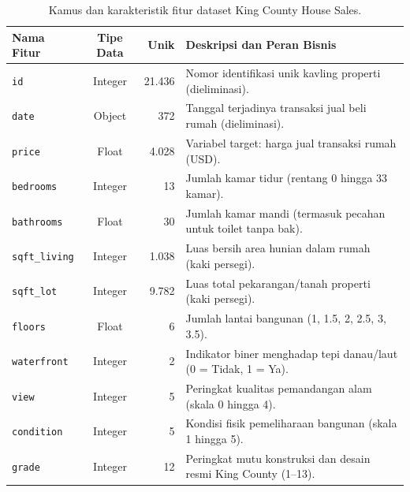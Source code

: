 \documentclass[a4paper,oneside,12pt]{report}
\begin{document}
\begin{table}[H]
	\centering
	\caption{Kamus dan karakteristik fitur dataset King County House Sales.}
	\label{tab:fitur-kc}
	\scriptsize
	\begin{tabularx}{\linewidth}{|l|c|r|>{\raggedright\arraybackslash}X|}
		\hline
		\textbf{Nama Fitur}     & \textbf{Tipe Data} & \textbf{Unik} & \textbf{Deskripsi dan Peran Bisnis}                             \\
		\hline
		\texttt{id}             & Integer            & 21.436        & Nomor identifikasi unik kavling properti (dieliminasi).         \\
		\hline
		\texttt{date}           & Object             & 372           & Tanggal terjadinya transaksi jual beli rumah (dieliminasi).     \\
		\hline
		\texttt{price}          & Float              & 4.028         & Variabel target: harga jual transaksi rumah (USD).              \\
		\hline
		\texttt{bedrooms}       & Integer            & 13            & Jumlah kamar tidur (rentang 0 hingga 33 kamar).                 \\
		\hline
		\texttt{bathrooms}      & Float              & 30            & Jumlah kamar mandi (termasuk pecahan untuk toilet tanpa bak).   \\
		\hline
		\texttt{sqft\_living}   & Integer            & 1.038         & Luas bersih area hunian dalam rumah (kaki persegi).             \\
		\hline
		\texttt{sqft\_lot}      & Integer            & 9.782         & Luas total pekarangan/tanah properti (kaki persegi).            \\
		\hline
		\texttt{floors}         & Float              & 6             & Jumlah lantai bangunan (1, 1.5, 2, 2.5, 3, 3.5).                \\
		\hline
		\texttt{waterfront}     & Integer            & 2             & Indikator biner menghadap tepi danau/laut (0 = Tidak, 1 = Ya).  \\
		\hline
		\texttt{view}           & Integer            & 5             & Peringkat kualitas pemandangan alam (skala 0 hingga 4).         \\
		\hline
		\texttt{condition}      & Integer            & 5             & Kondisi fisik pemeliharaan bangunan (skala 1 hingga 5).         \\
		\hline
		\texttt{grade}          & Integer            & 12            & Peringkat mutu konstruksi dan desain resmi King County (1--13). \\

\end{tabularx}
\end{table}
\end{document}
